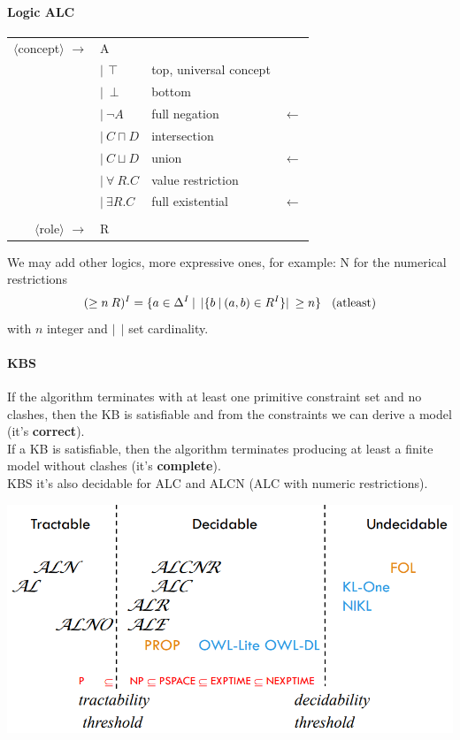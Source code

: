 \documentclass[10pt]{report}
\begin{document}
\paragraph{Logic ALC}
\begin{center}
	\begin{tabular}{r l l l}
	$\langle$concept$\rangle$ $\rightarrow$ & A\\
	& $|\:\intercal$ & top, universal concept\\
	& $|\:\perp$ & bottom\\
	& $|\:\neg A$ & full negation & $\leftarrow$\\
	& $|\:C\sqcap D$ & intersection\\
	& $|\:C\sqcup D$ & union & $\leftarrow$\\
	& $|\:\forall\:R.C$ & value restriction\\
	& $|\:\exists R.C$ & full existential & $\leftarrow$\\
	\\
	$\langle$role$\rangle$ $\rightarrow$ & R
	\end{tabular}
\end{center}
We may add other logics, more expressive ones, for example: N for the numerical restrictions
$$(\geq n\:R)^I = \{a\in\Delta^I\:|\:\:|\{b\:|\:(a,b)\in R^I\}|\:\geq n\}\:\:\:\:(\hbox{atleast})$$
with $n$ integer and $|\:\:|$ set cardinality.
\paragraph{KBS} If the algorithm terminates with at least one primitive constraint set and no clashes, then the KB is satisfiable and from the constraints we can derive a model (it's \textbf{correct}).\\
If a KB is satisfiable, then the algorithm terminates producing at least a finite model without clashes (it's \textbf{complete}).\\
KBS it's also decidable for ALC and ALCN (ALC with numeric restrictions).
\begin{center}
\includegraphics[scale=0.5]{30.png}
\end{center}
\end{document}
